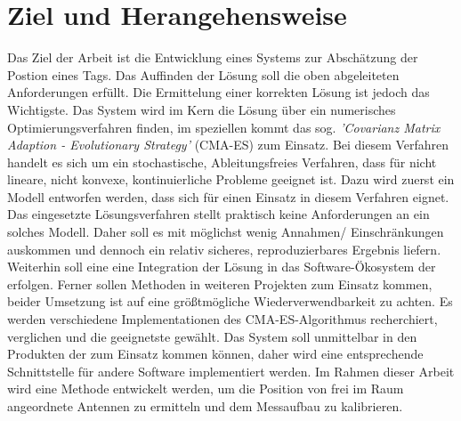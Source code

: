 \section{Ziel und Herangehensweise}
%
Das Ziel der Arbeit ist die Entwicklung eines Systems zur Abschätzung der Postion eines Tags. Das Auffinden der Lösung soll die oben abgeleiteten Anforderungen erfüllt. Die Ermittelung einer korrekten Lösung ist jedoch das Wichtigste. Das System wird im Kern die Lösung über ein numerisches Optimierungsverfahren finden, im speziellen kommt das sog. \textit{'Covarianz Matrix Adaption - Evolutionary Strategy'} (CMA-ES) zum Einsatz. Bei diesem Verfahren handelt es sich um ein stochastische, Ableitungsfreies Verfahren, dass für nicht lineare, nicht konvexe, kontinuierliche Probleme geeignet ist. Dazu wird zuerst ein Modell entworfen werden, dass sich für einen Einsatz in diesem Verfahren eignet. Das eingesetzte Lösungsverfahren stellt praktisch keine Anforderungen an ein solches Modell. Daher soll es mit möglichst wenig Annahmen/ Einschränkungen auskommen und dennoch ein relativ sicheres, reproduzierbares Ergebnis liefern. Weiterhin soll eine eine Integration der Lösung in das Software-Ökosystem der \amedogmbh erfolgen. Ferner sollen Methoden in weiteren Projekten zum Einsatz kommen, beider Umsetzung ist auf eine größtmögliche Wiederverwendbarkeit zu achten. Es werden verschiedene Implementationen des CMA-ES-Algorithmus recherchiert, verglichen und die geeignetste gewählt. Das System soll unmittelbar in den Produkten der \amedogmbh zum Einsatz kommen können, daher wird eine entsprechende Schnittstelle für andere Software implementiert werden. Im Rahmen dieser Arbeit wird eine Methode entwickelt werden, um die Position von frei im Raum angeordnete Antennen zu ermitteln und dem Messaufbau zu kalibrieren.
%
